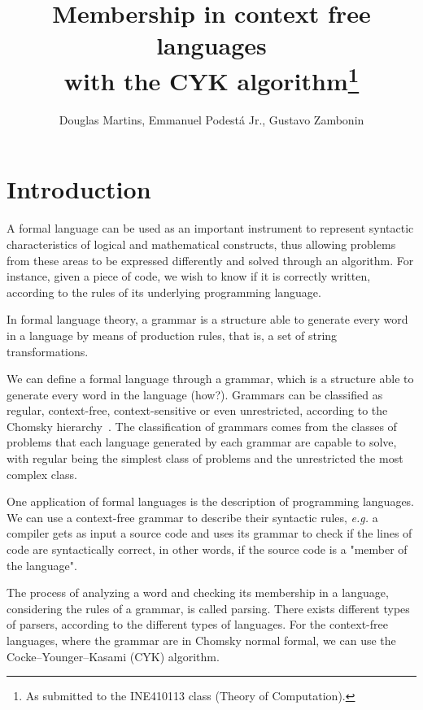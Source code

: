 \documentclass[12pt]{article}
\title{Membership in context free languages \\ with the CYK algorithm\footnote{
    As submitted to the INE410113 class (Theory of Computation).}}
\author{Douglas Martins\inst{1}, Emmanuel Podestá Jr.\inst{1}, Gustavo Zambonin\inst{1}}
\begin{document}
 

\maketitle

\section{Introduction}\label{sec:intro}
A formal language can be used as an important instrument to represent syntactic characteristics of logical and mathematical constructs, thus allowing problems from these areas to be expressed differently and solved through an algorithm. For instance, given a piece of code, we wish to know if it is correctly written, according to the rules of its underlying programming language.

In formal language theory, a grammar is a structure able to generate every word in a language by means of production rules, that is, a set of string transformations.



We can define a formal language through a grammar, which is a structure able to generate every word in the language (how?). Grammars can be classified as regular, context-free, context-sensitive or even unrestricted, according to the Chomsky hierarchy~\cite{}. The classification of grammars comes from the classes of problems that each language generated by each grammar are capable to solve, with regular being the simplest class of problems and the unrestricted the most complex class.

One application of formal languages is the description of programming languages. We can use a context-free grammar to describe their syntactic rules, \emph{e.g.} a compiler gets as input a source code and uses its grammar to check if the lines of code are syntactically correct, in other words, if the source code is a "member of the language". 

The process of analyzing a word and checking its membership in a language, considering the rules of a grammar, is called parsing. There exists different types of parsers, according to the different types of languages. For the context-free languages, where the grammar are in Chomsky normal formal, we can use the Cocke–Younger–Kasami (CYK) algorithm. 
\end{document}
